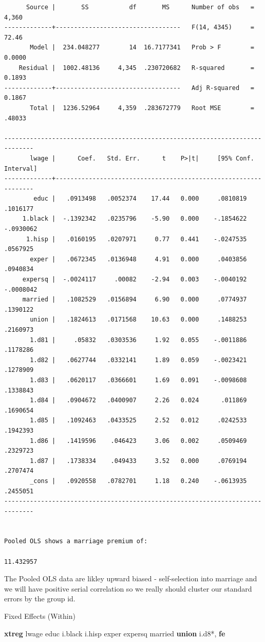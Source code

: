 \documentclass[
]{book}
\newenvironment{Shaded}{\begin{snugshade}}{\end{snugshade}}
\newcommand{\BaseNTok}[1]{\textcolor[rgb]{0.00,0.00,0.81}{#1}}
\newcommand{\KeywordTok}[1]{\textcolor[rgb]{0.13,0.29,0.53}{\textbf{#1}}}
\newcommand{\NormalTok}[1]{#1}
\begin{document}
\begin{verbatim}
      Source |       SS           df       MS      Number of obs   =     4,360
-------------+----------------------------------   F(14, 4345)     =     72.46
       Model |  234.048277        14  16.7177341   Prob > F        =    0.0000
    Residual |  1002.48136     4,345  .230720682   R-squared       =    0.1893
-------------+----------------------------------   Adj R-squared   =    0.1867
       Total |  1236.52964     4,359  .283672779   Root MSE        =    .48033

------------------------------------------------------------------------------
       lwage |      Coef.   Std. Err.      t    P>|t|     [95% Conf. Interval]
-------------+----------------------------------------------------------------
        educ |   .0913498   .0052374    17.44   0.000     .0810819    .1016177
     1.black |  -.1392342   .0235796    -5.90   0.000    -.1854622   -.0930062
      1.hisp |   .0160195   .0207971     0.77   0.441    -.0247535    .0567925
       exper |   .0672345   .0136948     4.91   0.000     .0403856    .0940834
     expersq |  -.0024117     .00082    -2.94   0.003    -.0040192   -.0008042
     married |   .1082529   .0156894     6.90   0.000     .0774937    .1390122
       union |   .1824613   .0171568    10.63   0.000     .1488253    .2160973
       1.d81 |     .05832   .0303536     1.92   0.055    -.0011886    .1178286
       1.d82 |   .0627744   .0332141     1.89   0.059    -.0023421    .1278909
       1.d83 |   .0620117   .0366601     1.69   0.091    -.0098608    .1338843
       1.d84 |   .0904672   .0400907     2.26   0.024      .011869    .1690654
       1.d85 |   .1092463   .0433525     2.52   0.012     .0242533    .1942393
       1.d86 |   .1419596    .046423     3.06   0.002     .0509469    .2329723
       1.d87 |   .1738334    .049433     3.52   0.000     .0769194    .2707474
       _cons |   .0920558   .0782701     1.18   0.240    -.0613935    .2455051
------------------------------------------------------------------------------


Pooled OLS shows a marriage premium of:

11.432957
\end{verbatim}

The Pooled OLS data are likley upward biased - self-selection into marriage and we will have positive serial correlation so we really should cluster our standard errors by the group id.

Fixed Effects (Within)

\begin{Shaded}
\begin{Highlighting}[]
\KeywordTok{xtreg}\NormalTok{ lwage educ i.}\BaseNTok{black}\NormalTok{ i.hisp exper expersq married }\KeywordTok{union}\NormalTok{ i.d8*, }\KeywordTok{fe}
\end{Highlighting}
\end{Shaded}
\end{document}
